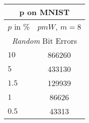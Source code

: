 \footnotesize
\begin{tabular}{|l|c|}
    \hline
    \multicolumn{2}{|c|}{$\mathbf{p}$ on \textbf{MNIST}}\\
    \hline
    $p$ in \% & $pmW$, $m = 8$\\
    \hline
    \hline
    \multicolumn{2}{|c|}{\textit{Random} Bit Errors}\\
    \hline
    $10$ & 866260\\
    $5$ & 433130\\
    $1.5$ & 129939\\
    $1$ & 86626\\
    $0.5$ & 43313\\
    \hline
\end{tabular}